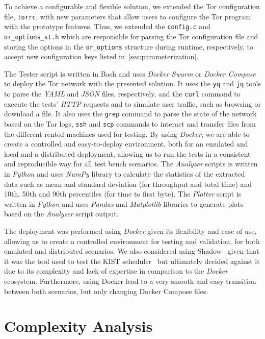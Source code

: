 To achieve a configurable and flexible solution, we extended the Tor configuration file, \texttt{torrc}, with new parameters that allow users to configure the Tor program with the prototype features. Thus, we extended the 
\texttt{config.c} and \texttt{or\_options\_st.h} which are responsible for parsing the Tor configuration file and storing the options in the \texttt{or\_options} structure during runtime, respectively, to accept new configuration keys listed in~\autoref{sec:parameterization}.

The Tester script is written in Bash and uses \textit{Docker Swarm} or \textit{Docker Compose} to deploy the Tor network with the presented solution. It uses the \texttt{yq} and \texttt{jq} tools to parse the \textit{YAML} and \textit{JSON} files, respectively, and the \texttt{curl} command to execute the tests' \textit{HTTP} requests and to simulate user traffic, such as browsing or download a file. It also uses the \texttt{grep} command to parse the state of the network based on the Tor logs, \texttt{ssh} and \texttt{scp} commands to interact and transfer files from the different rented machines used for testing. By using \textit{Docker}, we are able to create a controlled and easy-to-deploy environment, both for an emulated and local and a distributed deployment, allowing us to run the tests in a consistent and reproducible way for all test bench scenarios. 
The \textit{Analyzer} scripts is written in \textit{Python} and uses \textit{NumPy} library to calculate the statistics of the extracted data such as mean and standard deviation (for throughput and total time) and 10th, 50th and 90th percentiles (for time to first byte).   
The \textit{Plotter} script is written in \textit{Python} and uses \textit{Pandas} and \textit{Matplotlib} libraries to generate plots based on the \textit{Analyzer} script output.

The deployment was performed using \textit{Docker} given its flexibility and ease of use, allowing us to create a controlled environment for testing and validation, for both emulated and distributed scenarios. We also considered using Shadow~\cite{shadow-ndss2012} given that it was the tool used to test the KIST scheduler~\cite{KIST} but ultimately decided against it due to its complexity and lack of expertise in comparison to the \textit{Docker} ecosystem. Furthermore, using Docker lead to a very smooth and easy transition between both scenarios, but only changing Docker Compose files. 


\section{Complexity Analysis}\label{sec:complexity_analysis}

